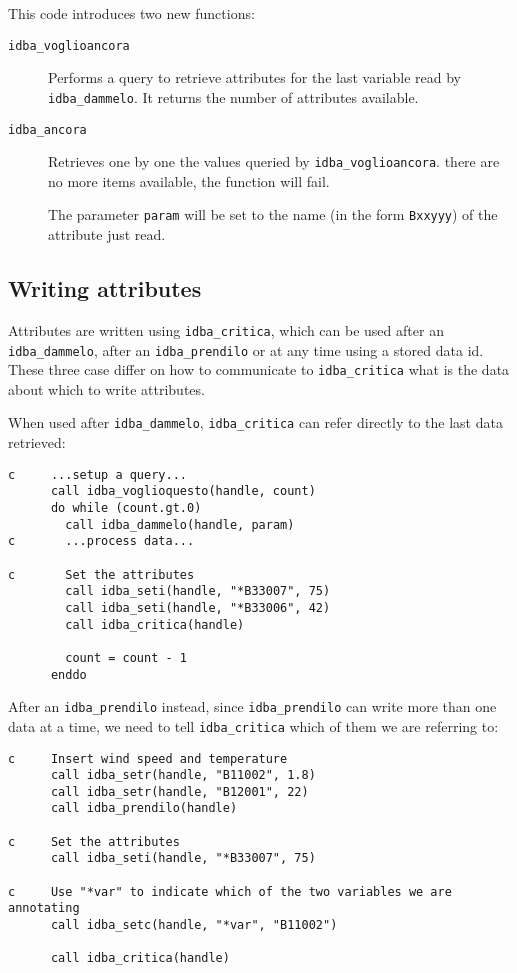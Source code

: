 \documentclass[final,12pt,a4paper,twoside]{book}
\begin{document}
This code introduces two new functions:

\begin{description}
\item[{\tt idba\_voglioancora}]
  Performs a query to retrieve attributes for the last variable read by
  {\tt idba\_dammelo}.  It returns the number of attributes available.
\item[{\tt idba\_ancora}]
  Retrieves one by one the values queried by {\tt idba\_voglioancora}.
  there are no more items available, the function will fail.

  The parameter {\tt param} will be set to the name (in the form {\tt *Bxxyyy}) of
  the attribute just read.
\end{description}

\subsection{Writing attributes}

\label{fun-idba_critica}

Attributes are written using {\tt idba\_critica}, which can be used after an
{\tt idba\_dammelo}, after an {\tt idba\_prendilo} or at any time using a stored data
id.  These three case differ on how to communicate to {\tt idba\_critica} what is
the data about which to write attributes.

When used after {\tt idba\_dammelo}, {\tt idba\_critica} can refer directly to the
last data retrieved:

\begin{verbatim}
c     ...setup a query...
      call idba_voglioquesto(handle, count)
      do while (count.gt.0)
        call idba_dammelo(handle, param)
c       ...process data...

c       Set the attributes
        call idba_seti(handle, "*B33007", 75)
        call idba_seti(handle, "*B33006", 42)
        call idba_critica(handle)

        count = count - 1
      enddo
\end{verbatim}

After an {\tt idba\_prendilo} instead, since {\tt idba\_prendilo} can write more than
one data at a time, we need to tell {\tt idba\_critica} which of them we are
referring to:

\begin{verbatim}
c     Insert wind speed and temperature
      call idba_setr(handle, "B11002", 1.8)
      call idba_setr(handle, "B12001", 22)
      call idba_prendilo(handle)

c     Set the attributes
      call idba_seti(handle, "*B33007", 75)

c     Use "*var" to indicate which of the two variables we are annotating
      call idba_setc(handle, "*var", "B11002")

      call idba_critica(handle)
\end{verbatim}
\end{document}
